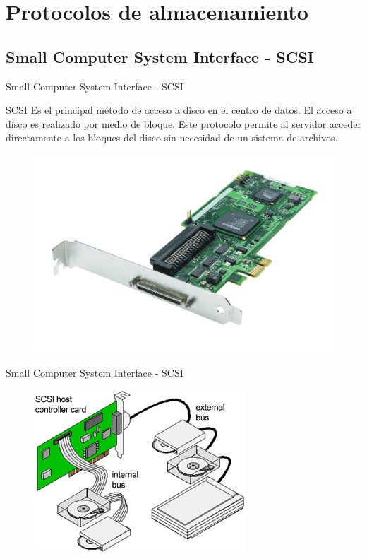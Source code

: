 \documentclass[10pt]{beamer}
\begin{document}
\section{Protocolos de almacenamiento}

\subsection{Small Computer System Interface - SCSI}

\begin{frame}{Small Computer System Interface - SCSI}
\begin{alertblock}{SCSI}
Es el principal método de acceso a disco en el centro de datos. El
acceso a disco es realizado por medio de bloque. Este protocolo permite al servidor acceder directamente a los bloques del disco sin necesidad de un sistema de archivos.
\end{alertblock}
\begin{figure}[h]
\center
\includegraphics[scale=0.13]{scsi.jpg}
\end{figure}

\end{frame}
\begin{frame}{Small Computer System Interface - SCSI}
\begin{figure}[h]
\center
\includegraphics[scale=0.9]{scsi1.jpg}
\end{figure}
\end{frame}
\end{document}

